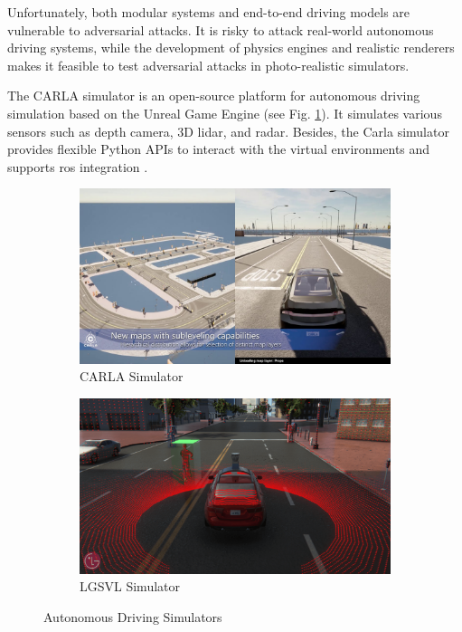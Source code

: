 Unfortunately, both modular systems and end-to-end driving models are vulnerable to adversarial attacks. It is risky to attack real-world autonomous driving systems, while the development of physics engines and realistic renderers makes it feasible to test adversarial attacks in photo-realistic simulators.
 

The CARLA simulator is an open-source platform for autonomous driving simulation based on the Unreal Game Engine (see Fig. \ref{fig:carla_intro}). It simulates various sensors such as depth camera, 3D lidar, and radar. Besides, the Carla simulator provides flexible Python APIs to interact with the virtual environments and supports \acrfull{ros} integration \citep{Dosovitskiy17}.

\begin{figure}[H]
\centering
\begin{subfigure}[b]{0.49\textwidth}
    \centering
    \includegraphics[width=\textwidth]{figures/chapter_intro/carla.jpg}
    \caption{CARLA Simulator \citep{Dosovitskiy17}}
    \label{fig:carla_intro}
\end{subfigure}
\hfill
\begin{subfigure}[b]{0.49\textwidth}
    \centering
    \includegraphics[width=\textwidth]{figures/chapter_intro/lgsvl.png}
    \caption{LGSVL Simulator\citep{rong2020lgsvl}}
    \label{fig:lvsvl}
\end{subfigure}
\hfill
\caption{Autonomous Driving Simulators}
\label{fig.simulator}
\end{figure}

